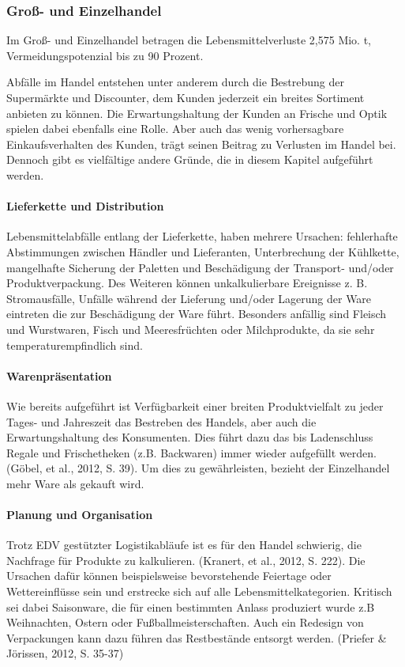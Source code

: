 \subsubsection{Groß- und Einzelhandel}
Im Groß- und Einzelhandel betragen die Lebensmittelverluste 2,575 Mio. t, Vermeidungspotenzial bis zu 90 Prozent. %

Abfälle im Handel entstehen unter anderem durch die Bestrebung der Supermärkte und Discounter, dem Kunden jederzeit ein breites Sortiment anbieten zu können. Die Erwartungshaltung der Kunden an Frische und Optik spielen dabei ebenfalls eine Rolle. Aber auch das wenig vorhersagbare Einkaufsverhalten des Kunden, trägt seinen Beitrag zu Verlusten im Handel bei. %
Dennoch gibt es vielfältige andere Gründe, die in diesem Kapitel aufgeführt werden.


\paragraph{Lieferkette und Distribution}
Lebensmittelabfälle entlang der Lieferkette, haben mehrere Ursachen: fehlerhafte Abstimmungen zwischen Händler und Lieferanten, Unterbrechung der Kühlkette, mangelhafte Sicherung der Paletten und Beschädigung der Transport- und/oder Produktverpackung. Des Weiteren können unkalkulierbare Ereignisse z. B. Stromausfälle, Unfälle während der Lieferung und/oder Lagerung der Ware eintreten die zur Beschädigung der Ware führt. %
	 Besonders anfällig sind Fleisch und Wurstwaren, Fisch und Meeresfrüchten oder Milchprodukte, da sie sehr temperaturempfindlich sind. %
	 \paragraph{Warenpräsentation}
Wie bereits aufgeführt ist Verfügbarkeit einer breiten Produktvielfalt zu jeder Tages- und Jahreszeit das Bestreben des Handels, aber auch die Erwartungshaltung des Konsumenten.%
Dies führt dazu das bis Ladenschluss Regale und Frischetheken (z.B. Backwaren) immer wieder aufgefüllt werden. (Göbel, et al., 2012, S. 39). Um dies zu gewährleisten, bezieht der Einzelhandel mehr Ware als gekauft wird. %

\paragraph{Planung und Organisation}
Trotz EDV gestützter Logistikabläufe ist es für den Handel schwierig, die Nachfrage für Produkte zu kalkulieren. (Kranert, et al., 2012, S. 222). Die Ursachen dafür können beispielsweise bevorstehende Feiertage oder Wettereinflüsse sein und erstrecke sich auf alle Lebensmittelkategorien. Kritisch sei dabei Saisonware, die für einen bestimmten Anlass produziert wurde z.B Weihnachten, Ostern oder Fußballmeisterschaften. Auch ein Redesign von Verpackungen kann dazu führen das Restbestände entsorgt werden. (Priefer & Jörissen, 2012, S. 35-37) %


